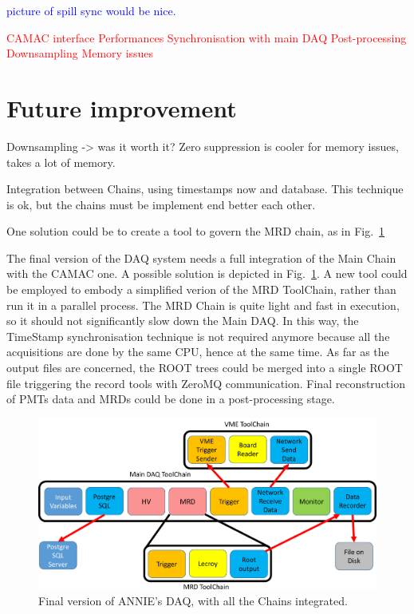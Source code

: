 \textcolor{blue}{picture of spill sync would be nice.}

\textcolor{red}{
CAMAC interface
Performances
Synchronisation with main DAQ
Post-processing
Downsampling
Memory issues
}

\section{Future improvement}
\label{sec:3.3}
{
\color{red}
Downsampling -> was it worth it?
Zero suppression is cooler for memory issues, takes a lot of memory.

Integration between Chains, using timestamps now and database.
This technique is ok, but the chains must be implement end better each other.

One solution could be to create a tool to govern the MRD chain, as in Fig.~\ref{fig:daqcomplete}
}

The final version of the DAQ system needs a full integration of the Main Chain with the %
CAMAC one.
A possible solution is depicted in Fig.~\ref{fig:daqcomplete}.
A new tool could be employed to embody a simplified verion of the MRD ToolChain, rather than %
run it in a parallel process.
The MRD Chain is quite light and fast in execution, so it should not %
significantly slow down the Main DAQ.
In this way, the TimeStamp synchronisation technique is not required anymore because all the %
acquisitions are done by the same CPU, hence at the same time.
As far as the output files are concerned, the ROOT trees could be merged into a single ROOT file %
triggering the record tools with ZeroMQ communication.
Final reconstruction of PMTs data and MRDs could be done in a post-processing stage.

\begin{figure}[]
  \centering
  \includegraphics[scale=0.17]{pics/pag5richardshkmeeting}
  \caption{Final version of ANNIE's DAQ, with all the Chains integrated.}
  \label{fig:daqcomplete}
\end{figure}


